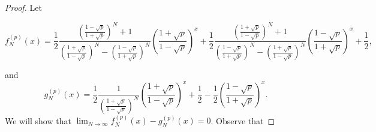 \documentclass[reqno]{amsart}
\theoremstyle{definition}
\theoremstyle{definition}
\theoremstyle{remark}
\begin{document}
\begin{proof}
Let 

\begin{equation}\label{eq: fNx}
    f_N^{(p)}(x)=\frac{1}{2}\frac{\left(\frac{1-\sqrt{p}}{1+\sqrt{p}}\right)^N+1}{\left(\frac{1+\sqrt{p}}{1-\sqrt{p}}\right)^N-\left(\frac{1-\sqrt{p}}{1+\sqrt{p}}\right)^N}\left(\frac{1+\sqrt{p}}{1-\sqrt{p}}\right)^x
    +\frac{1}{2}\frac{\left(\frac{1+\sqrt{p}}{1-\sqrt{p}}\right)^N+1}{\left(\frac{1-\sqrt{p}}{1+\sqrt{p}}\right)^N-\left(\frac{1+\sqrt{p}}{1-\sqrt{p}}\right)^N}\left(\frac{1-\sqrt{p}}{1+\sqrt{p}}\right)^x+\frac{1}{2},
\end{equation}

    and \[g_N^{(p)}(x)=\frac{1}{2}\frac{1}{\left(\frac{1+\sqrt{p}}{1-\sqrt{p}}\right)^N}\left(\frac{1+\sqrt{p}}{1-\sqrt{p}}\right)^x+\frac{1}{2}-\frac{1}{2}\left(\frac{1-\sqrt{p}}{1+\sqrt{p}}\right)^x.\]
    We will show that $\lim_{N\to\infty}f_N^{(p)}(x)-g_N^{(p)}(x)=0$.
    Observe that
    

\end{proof}
\end{document}
